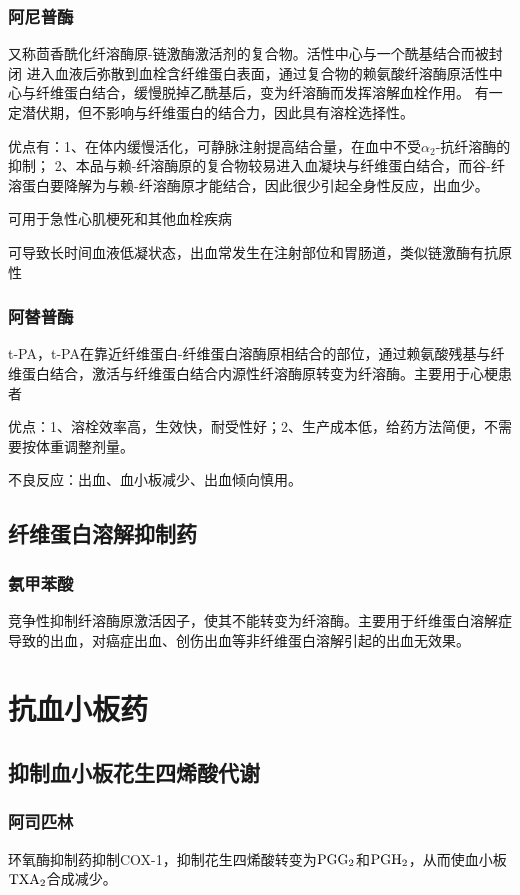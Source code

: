 \documentclass[UTF8]{ctexbook}
\begin{document}
\subsubsection{阿尼普酶}
又称茴香酰化纤溶酶原-链激酶激活剂的复合物。活性中心与一个酰基结合而被封闭
进入血液后弥散到血栓含纤维蛋白表面，通过复合物的赖氨酸纤溶酶原活性中心与纤维蛋白结合，缓慢脱掉乙酰基后，变为纤溶酶而发挥溶解血栓作用。
有一定潜伏期，但不影响与纤维蛋白的结合力，因此具有溶栓选择性。

优点有：1、在体内缓慢活化，可静脉注射提高结合量，在血中不受\( \alpha _{2}\)-抗纤溶酶的抑制；
2、本品与赖-纤溶酶原的复合物较易进入血凝块与纤维蛋白结合，而谷-纤溶蛋白要降解为与赖-纤溶酶原才能结合，因此很少引起全身性反应，出血少。

可用于急性心肌梗死和其他血栓疾病

可导致长时间血液低凝状态，出血常发生在注射部位和胃肠道，类似链激酶有抗原性
\subsubsection{阿替普酶}
t-PA，t-PA在靠近纤维蛋白-纤维蛋白溶酶原相结合的部位，通过赖氨酸残基与纤维蛋白结合，激活与纤维蛋白结合内源性纤溶酶原转变为纤溶酶。主要用于心梗患者

优点：1、溶栓效率高，生效快，耐受性好；2、生产成本低，给药方法简便，不需要按体重调整剂量。

不良反应：出血、血小板减少、出血倾向慎用。
\subsection{纤维蛋白溶解抑制药}
\subsubsection{氨甲苯酸}
竞争性抑制纤溶酶原激活因子，使其不能转变为纤溶酶。主要用于纤维蛋白溶解症导致的出血，对癌症出血、创伤出血等非纤维蛋白溶解引起的出血无效果。
\section{抗血小板药}
\subsection{抑制血小板花生四烯酸代谢}
\subsubsection{阿司匹林}
环氧酶抑制药抑制COX-1，抑制花生四烯酸转变为\(\textup{PGG}_{2}\)和\(\textup{PGH}_{2}\)，从而使血小板\(\textup{TXA}_{2}\)合成减少。
\end{document}
